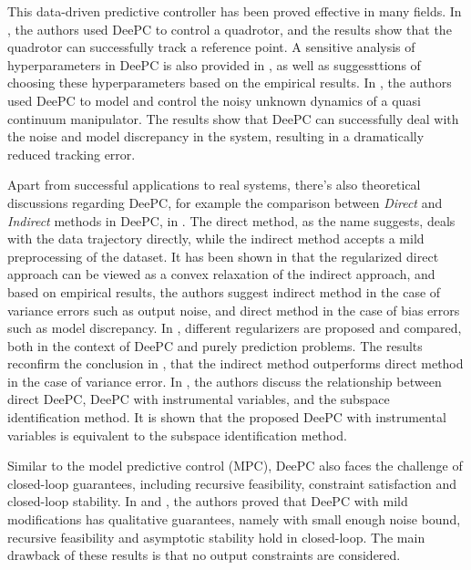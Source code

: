 This data-driven predictive controller has been proved effective in many fields.
In \cite{elokda_dataenabled_quadrotor_2021}, the authors used DeePC to control a quadrotor, and the results show that the quadrotor can successfully track a reference point.
A sensitive analysis of hyperparameters in DeePC is also provided in \cite{elokda_dataenabled_quadrotor_2021}, as well as suggessttions of choosing these hyperparameters based on the empirical results.
In \cite{muller_qcm_2022}, the authors used DeePC to model and control the noisy unknown dynamics of a quasi continuum manipulator.
The results show that DeePC can successfully deal with the noise and model discrepancy in the system, resulting in a dramatically reduced tracking error.

Apart from successful applications to real systems, there's also theoretical discussions regarding DeePC, for example the comparison between \emph{Direct} and \emph{Indirect} methods in DeePC, in \cite{dorfler_direct_indirect_2023}.
The direct method, as the name suggests, deals with the data trajectory directly, while the indirect method accepts a mild preprocessing of the dataset.
It has been shown in \cite{dorfler_direct_indirect_2023} that the regularized direct approach can be viewed as a convex relaxation of the indirect approach, and based on empirical results, the authors suggest indirect method in the case of variance errors such as output noise, and direct method in the case of bias errors such as model discrepancy.
In \cite{mattsson_regularization_deepc_2023}, different regularizers are proposed and compared, both in the context of DeePC and purely prediction problems.
The results reconfirm the conclusion in \cite{dorfler_direct_indirect_2023}, that the indirect method outperforms direct method in the case of variance error.
In \cite{van_wingerden_instrumental_2022}, the authors discuss the relationship between direct DeePC, DeePC with instrumental variables, and the subspace identification method.
It is shown that the proposed DeePC with instrumental variables is equivalent to the subspace identification method.

Similar to the model predictive control (MPC), DeePC also faces the challenge of closed-loop guarantees, including recursive feasibility, constraint satisfaction and closed-loop stability.
In \cite{berberich_data-driven-robust_2021} and \cite{berberich_stability_inherent_2022}, the authors proved that DeePC with mild modifications has qualitative guarantees, namely with small enough noise bound, recursive feasibility and asymptotic stability hold in closed-loop.
The main drawback of these results is that no output constraints are considered.


